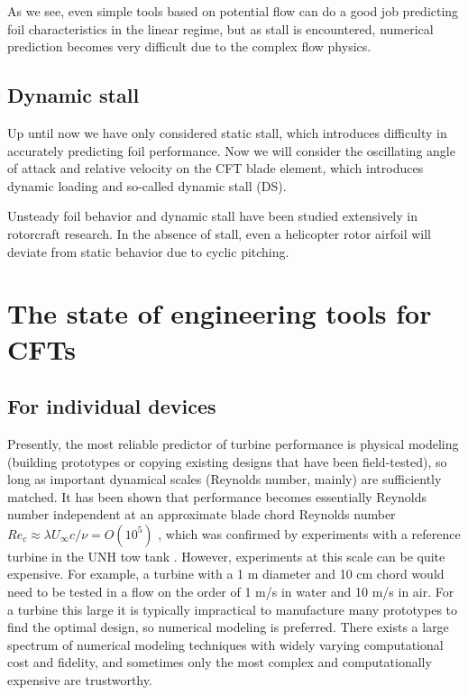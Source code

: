  As we see, even simple tools based on
potential flow can do a good job predicting foil characteristics in the linear
regime, but as stall is encountered, numerical prediction becomes very difficult
due to the complex flow physics.


\subsection{Dynamic stall}

Up until now we have only considered static stall, which introduces difficulty
in accurately predicting foil performance. Now we will consider the oscillating
angle of attack and relative velocity on the CFT blade element, which introduces
dynamic loading and so-called dynamic stall (DS).

Unsteady foil behavior and dynamic stall have been studied extensively in
rotorcraft research. In the absence of stall, even a helicopter rotor airfoil
will deviate from static behavior due to cyclic pitching.



\section{The state of engineering tools for CFTs}

\subsection{For individual devices}

Presently, the most reliable predictor of turbine performance is physical
modeling (building prototypes or copying existing designs that have been
field-tested), so long as important dynamical scales (Reynolds number, mainly)
are sufficiently matched. It has been shown that performance becomes essentially
Reynolds number independent at an approximate blade chord Reynolds number $Re_c
\approx \lambda U_\infty c / \nu = O(10^5)$ \cite{Bravo2007}, which was
confirmed by experiments with a reference turbine in the UNH tow tank
\cite{Bachant2014}. However, experiments at this scale can be quite expensive.
For example, a turbine with a 1 m diameter and 10 cm chord would need to be
tested in a flow on the order of 1 m/s in water and 10 m/s in air. For a turbine
this large it is typically impractical to manufacture many prototypes to find
the optimal design, so numerical modeling is preferred. There exists a large
spectrum of numerical modeling techniques with widely varying computational cost
and fidelity, and sometimes only the most complex and computationally expensive
are trustworthy.

